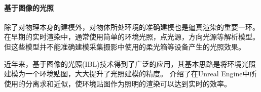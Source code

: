\paragraph{基于图像的光照}

除了对物理本身的建模外，对物体所处环境的准确建模也是逼真渲染的重要一环。
在早期的实时渲染中，通常使用简单的环境光照，点光源，方向光源等解析模型。
但这些模型并不能准确建模采集摄影中使用的柔光箱等设备产生的光照效果。

近年来，基于图像的光照(IBL)技术得到了广泛的应用，其基本思路是将环境光照建模为一个环境贴图，大大提升了光照建模的精度。
\citet{unreal_ssa}介绍了在Unreal Engine中所使用的分离求和近似，使环境贴图作为照明的渲染可以达到实时的效率。
